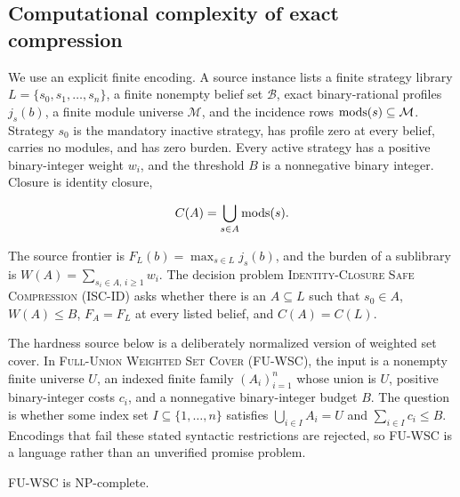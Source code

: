 \subsection{Computational complexity of exact compression}
\label{subsec:aor-safe-compression-complexity}

We use an explicit finite encoding. A source instance lists a finite strategy
library $L=\{s_0,s_1,\ldots,s_n\}$, a finite nonempty belief set
$\mathcal B$, exact binary-rational profiles $j_s(b)$, a finite module
universe $\mathcal M$, and the incidence rows
$\operatorname{mods}(s)\subseteq\mathcal M$. Strategy $s_0$ is the mandatory inactive
strategy, has profile zero at every belief, carries no modules, and has zero
burden. Every active strategy has a positive binary-integer weight $w_i$, and
the threshold $B$ is a nonnegative binary integer. Closure is identity
closure,

\[
  C(A)=\bigcup_{s\in A}\operatorname{mods}(s).
\]

The source frontier is $F_L(b)=\max_{s\in L}j_s(b)$, and the burden of a
sublibrary is $W(A)=\sum_{s_i\in A,\,i\geq 1}w_i$. The decision problem
\textsc{Identity-Closure Safe Compression} (\textsc{ISC-ID}) asks whether
there is an $A\subseteq L$ such that $s_0\in A$, $W(A)\leq B$,
$F_A=F_L$ at every listed belief, and $C(A)=C(L)$.

The hardness source below is a deliberately normalized version of weighted
set cover. In \textsc{Full-Union Weighted Set Cover} (\textsc{FU-WSC}), the
input is a nonempty finite universe $U$, an indexed finite family
$(A_i)_{i=1}^n$ whose union is $U$, positive binary-integer costs $c_i$, and a
nonnegative binary-integer budget $B$. The question is whether some index set
$I\subseteq\{1,\ldots,n\}$ satisfies
$\bigcup_{i\in I}A_i=U$ and $\sum_{i\in I}c_i\leq B$.
Encodings that fail these stated syntactic restrictions are rejected, so
\textsc{FU-WSC} is a language rather than an unverified promise problem.

\begin{lemma}
\label{lem:aor-full-union-weighted-set-cover}
\textnormal{\textsc{FU-WSC}} is NP-complete.
\end{lemma}

